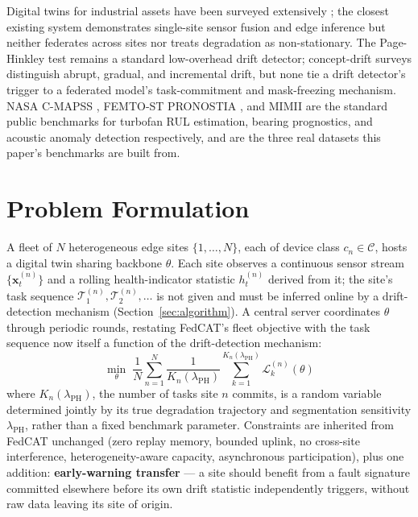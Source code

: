 \documentclass[journal]{IEEEtran}
\begin{document}
Digital twins for industrial assets have been surveyed extensively \cite{tao2019twin,lei2018prognostics}; the closest existing system \cite{tinyml6g2026} demonstrates single-site sensor fusion and edge inference but neither federates across sites nor treats degradation as non-stationary. The Page-Hinkley test \cite{page1954} remains a standard low-overhead drift detector; concept-drift surveys \cite{gama2014survey,lu2019review} distinguish abrupt, gradual, and incremental drift, but none tie a drift detector's trigger to a federated model's task-commitment and mask-freezing mechanism. NASA C-MAPSS \cite{saxena2008cmapss}, FEMTO-ST PRONOSTIA \cite{nectoux2012pronostia}, and MIMII \cite{purohit2019mimii} are the standard public benchmarks for turbofan RUL estimation, bearing prognostics, and acoustic anomaly detection respectively, and are the three real datasets this paper's benchmarks are built from.

\section{Problem Formulation}

A fleet of $N$ heterogeneous edge sites $\{1,\ldots,N\}$, each of device class $c_n \in \mathcal{C}$, hosts a digital twin sharing backbone $\theta$. Each site observes a continuous sensor stream $\{\mathbf{x}_t^{(n)}\}$ and a rolling health-indicator statistic $h_t^{(n)}$ derived from it; the site's task sequence $\mathcal{T}_1^{(n)}, \mathcal{T}_2^{(n)}, \ldots$ is not given and must be inferred online by a drift-detection mechanism (Section~\ref{sec:algorithm}). A central server coordinates $\theta$ through periodic rounds, restating FedCAT's fleet objective with the task sequence now itself a function of the drift-detection mechanism:
\begin{equation}
\min_\theta \; \frac{1}{N} \sum_{n=1}^{N} \frac{1}{K_n(\lambda_{\text{PH}})} \sum_{k=1}^{K_n(\lambda_{\text{PH}})} \mathcal{L}_k^{(n)}(\theta)
\label{eq:objective}
\end{equation}
where $K_n(\lambda_{\text{PH}})$, the number of tasks site $n$ commits, is a random variable determined jointly by its true degradation trajectory and segmentation sensitivity $\lambda_{\text{PH}}$, rather than a fixed benchmark parameter. Constraints are inherited from FedCAT unchanged (zero replay memory, bounded uplink, no cross-site interference, heterogeneity-aware capacity, asynchronous participation), plus one addition: \textbf{early-warning transfer} — a site should benefit from a fault signature committed elsewhere before its own drift statistic independently triggers, without raw data leaving its site of origin.
\end{document}
